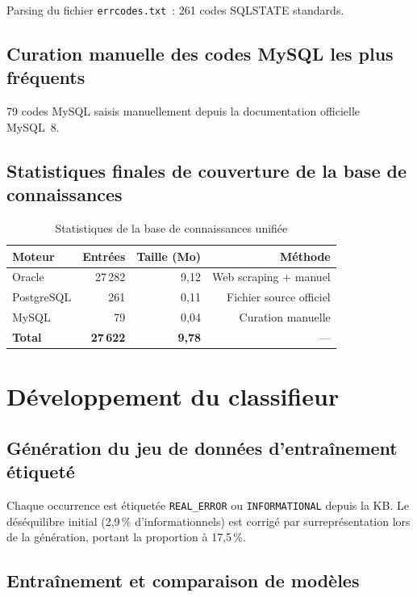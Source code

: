 \documentclass[12pt,a4paper]{report}
\begin{document}
Parsing du fichier \texttt{errcodes.txt}~: 261 codes SQLSTATE standards.

\subsection{Curation manuelle des codes MySQL les plus fr\'equents}

79 codes MySQL saisis manuellement depuis la documentation officielle MySQL~8.

\subsection{Statistiques finales de couverture de la base de connaissances}

\begin{table}[H]
  \centering
  \caption{Statistiques de la base de connaissances unifi\'ee}
  \label{tab:kb_stats}
  \begin{tabular}{lrrr}
    \toprule
    \textbf{Moteur} & \textbf{Entr\'ees} & \textbf{Taille (Mo)} & \textbf{M\'ethode} \\
    \midrule
    Oracle      & 27\,282 & 9,12 & Web scraping + manuel \\
    PostgreSQL  & 261     & 0,11 & Fichier source officiel \\
    MySQL       & 79      & 0,04 & Curation manuelle \\
    \midrule
    \textbf{Total} & \textbf{27\,622} & \textbf{9,78} & --- \\
    \bottomrule
  \end{tabular}
\end{table}

\section{D\'eveloppement du classifieur}

\subsection{G\'en\'eration du jeu de donn\'ees d'entra\^inement \'etiquet\'e}

Chaque occurrence est \'etiquet\'ee \texttt{REAL\_ERROR} ou \texttt{INFORMATIONAL}
depuis la KB. Le d\'es\'equilibre initial (2,9\,\% d'informationnels) est corrig\'e
par surrepr\'esentation lors de la g\'en\'eration, portant la proportion \`a 17,5\,\%.

\subsection{Entra\^inement et comparaison de mod\`eles}
\end{document}
